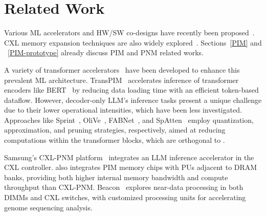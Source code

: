 \section{Related Work}

Various ML accelerators and HW/SW co-designs have recently been proposed~\cite{eyeriss, in-switch, maeri}. CXL memory expansion techniques are also widely explored~\cite{CXL-DL, CXL-DB, Demystify-CXL, cxl-memory-pool, jang2023cxl, gouk2022direct}. Sections~\ref{PIM} and ~\ref{PIM-prototype} already discuss PIM and PNM related works.

 A variety of transformer accelerators~\cite{elsa, dota, sanger, FACT} have been developed to enhance this prevalent ML architecture.
TransPIM~\cite{transpim} accelerates inference of transformer encoders like BERT~\cite{bert} by reducing data loading time with an efficient token-based dataflow.
However, decoder-only LLM's inference tasks present a unique challenge due to their lower operational intensities, which have been less investigated. 
Approaches like Sprint~\cite{sprint}, OliVe~\cite{olive}, FABNet~\cite{FABNet}, and SpAtten~\cite{spatten} employ quantization, approximation, and pruning strategies, respectively, aimed at reducing computations within the transformer blocks, which are orthogonal to \att{}.

  Samsung's CXL-PNM platform~\cite{cxl-pnm, samsung_pimpnm} integrates an LLM inference accelerator in the CXL controller. \att{} also integrates PIM memory chips with PUs adjacent to DRAM banks, providing both higher internal memory bandwidth and compute throughput than CXL-PNM.
Beacon~\cite{huangfu2022beacon} explores near-data processing in both DIMMs and CXL switches, with customized processing units for accelerating genome sequencing analysis.



